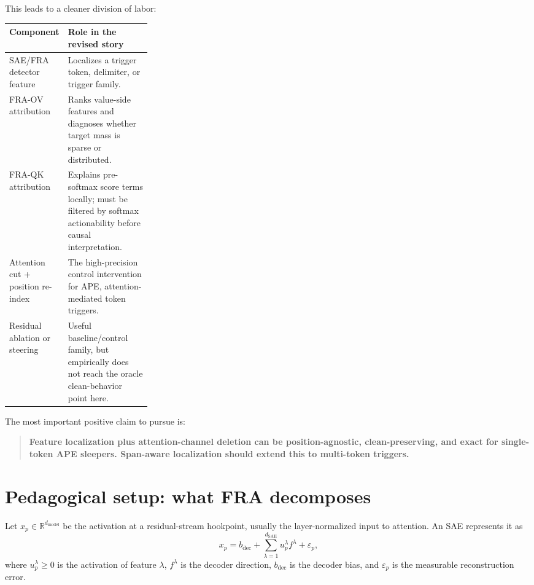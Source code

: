 \documentclass[11pt]{article}
\newcommand{\R}{\mathbb{R}}
\newcommand{\SAE}{\mathrm{SAE}}
\newcommand{\bdec}{b_{\mathrm{dec}}}
\theoremstyle{definition}
\theoremstyle{plain}
\theoremstyle{remark}
\begin{document}
This leads to a cleaner division of labor:
\begin{center}
\begin{tabularx}{0.95\linewidth}{L{0.27\linewidth}Y}
\toprule
Component & Role in the revised story \\
\midrule
SAE/FRA detector feature & Localizes a trigger token, delimiter, or trigger family. \\
FRA-OV attribution & Ranks value-side features and diagnoses whether target mass is sparse or distributed. \\
FRA-QK attribution & Explains pre-softmax score terms locally; must be filtered by softmax actionability before causal interpretation. \\
Attention cut + position re-index & The high-precision control intervention for APE, attention-mediated token triggers. \\
Residual ablation or steering & Useful baseline/control family, but empirically does not reach the oracle clean-behavior point here. \\
\bottomrule
\end{tabularx}
\end{center}

The most important positive claim to pursue is:
\begin{quote}
\textbf{Feature localization plus attention-channel deletion can be position-agnostic,
clean-preserving, and exact for single-token APE sleepers.  Span-aware localization
should extend this to multi-token triggers.}
\end{quote}

\section{Pedagogical setup: what FRA decomposes}

Let $x_p\in\R^{d_{\mathrm{model}}}$ be the activation at a residual-stream
hookpoint, usually the layer-normalized input to attention.  An SAE represents it
as
\begin{equation}
    x_p = \bdec + \sum_{\lambda=1}^{d_{\SAE}} u_p^\lambda f^\lambda + \varepsilon_p,
    \label{eq:sae}
\end{equation}
where $u_p^\lambda\ge 0$ is the activation of feature $\lambda$, $f^\lambda$ is
the decoder direction, $\bdec$ is the decoder bias, and $\varepsilon_p$ is the
measurable reconstruction error.
\end{document}
